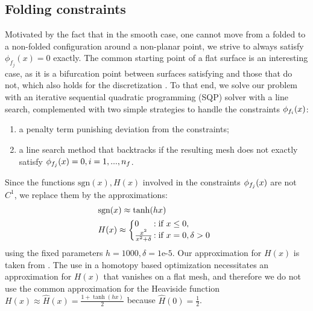 \subsection{Folding constraints} \label{opt:folding}
Motivated by the fact that in the smooth case, one cannot move from a folded to a non-folded configuration around a non-planar point, we strive to always satisfy $\phi_{f_j}(x) = 0$ exactly. The common starting point of a flat surface is an interesting case, as it is a bifurcation point between surfaces satisfying  and those that do not, which also holds for the discretization . To that end, we solve our problem with an iterative sequential quadratic programming (SQP) solver with a line search, complemented with two simple strategies to handle the constraints $\phi_{f_i}(x)$:
\begin{enumerate}
	\item a penalty term \cite{nocedal} punishing  deviation from the constraints; \label{opt:penalty}
	\item a line search method that backtracks if the resulting mesh does not exactly satisfy $\phi_{f_j}(x) = 0, i = 1,...,n_f$.
\end{enumerate}
Since the functions $\text{sgn}(x),H(x)$ involved in the constraints $\phi_{f_j}(x)$ are not $C^1$, we replace them by the approximations:
%
\begin{align} 
\begin{split}\label{eq:const_inner}
&\text{sgn}(x) \approx \tanh(hx) \\
&H(x) \approx  \left\{\begin{array}{@{}l@{\thinspace}l}
0  &: \text{if } x \leq 0, \\
\frac{x^2}{x^2+\delta} &: \text{if } x = 0, \delta > 0 \\
\end{array}\right.
\end{split}
\end{align}
using the fixed parameters $h=1000,\delta = \text{1e-5}$. Our approximation for $H(x)$ is taken from \cite{l0_approximation,autocuts}.  The use in a homotopy based optimization necessitates an approximation for $H(x)$ that vanishes on a flat mesh, and therefore we do not use the common approximation for the Heaviside function $H(x) \approx \hat{H}(x) =  \frac{1+\tanh(hx)}{2}$ because $\hat H(0) = \frac{1}{2}$.

